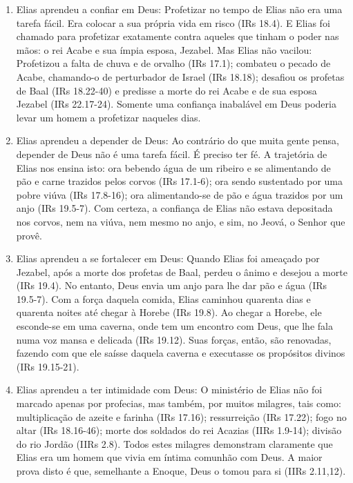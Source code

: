 \documentclass[
]{book}
\providecommand{\tightlist}{%
  \setlength{\itemsep}{0pt}\setlength{\parskip}{0pt}}
\begin{document}
\begin{itemize}
  \begin{enumerate}
  \def\labelenumi{\alph{enumi}.}
  \tightlist
  \item
    Elias aprendeu a confiar em Deus: Profetizar no tempo de Elias não era uma tarefa fácil. Era colocar a sua própria vida em risco (IRs 18.4). E Elias foi chamado para profetizar exatamente contra aqueles que tinham o poder nas mãos: o rei Acabe e sua ímpia esposa, Jezabel. Mas Elias não vacilou: Profetizou a falta de chuva e de orvalho (IRs 17.1); combateu o pecado de Acabe, chamando-o de perturbador de Israel (IRs 18.18); desafiou os profetas de Baal (IRs 18.22-40) e predisse a morte do rei Acabe e de sua esposa Jezabel (IRs 22.17-24). Somente uma confiança inabalável em Deus poderia levar um homem a profetizar naqueles dias.
  \item
    Elias aprendeu a depender de Deus: Ao contrário do que muita gente pensa, depender de Deus não é uma tarefa fácil. É preciso ter fé. A trajetória de Elias nos ensina isto: ora bebendo água de um ribeiro e se alimentando de pão e carne trazidos pelos corvos (IRs 17.1-6); ora sendo sustentado por uma pobre viúva (IRs 17.8-16); ora alimentando-se de pão e água trazidos por um anjo (IRs 19.5-7). Com certeza, a confiança de Elias não estava depositada nos corvos, nem na viúva, nem mesmo no anjo, e sim, no Jeová, o Senhor que provê.
  \item
    Elias aprendeu a se fortalecer em Deus: Quando Elias foi ameaçado por Jezabel, após a morte dos profetas de Baal, perdeu o ânimo e desejou a morte (IRs 19.4). No entanto, Deus envia um anjo para lhe dar pão e água (IRs 19.5-7). Com a força daquela comida, Elias caminhou quarenta dias e quarenta noites até chegar à Horebe (IRs 19.8). Ao chegar a Horebe, ele esconde-se em uma caverna, onde tem um encontro com Deus, que lhe fala numa voz mansa e delicada (IRs 19.12). Suas forças, então, são renovadas, fazendo com que ele saísse daquela caverna e executasse os propósitos divinos (IRs 19.15-21).
  \item
    Elias aprendeu a ter intimidade com Deus: O ministério de Elias não foi marcado apenas por profecias, mas também, por muitos milagres, tais como: multiplicação de azeite e farinha (IRs 17.16); ressurreição (IRs 17.22); fogo no altar (IRs 18.16-46); morte dos soldados do rei Acazias (IIRs 1.9-14); divisão do rio Jordão (IIRs 2.8). Todos estes milagres demonstram claramente que Elias era um homem que vivia em íntima comunhão com Deus. A maior prova disto é que, semelhante a Enoque, Deus o tomou para si (IIRs 2.11,12).

\end{enumerate}
\end{itemize}
\end{document}
